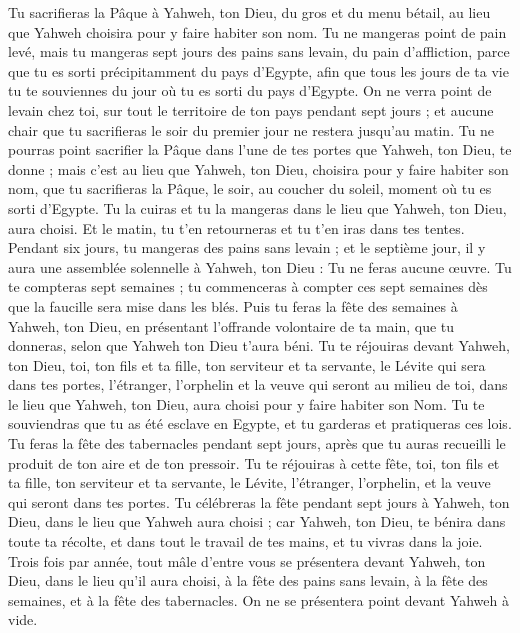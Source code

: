 \begin{multicols}{2}
Tu sacrifieras la Pâque à Yahweh, ton Dieu, du gros et du menu bétail, au lieu que Yahweh choisira pour y faire habiter son nom.
Tu ne mangeras point de pain levé, mais tu mangeras sept jours des pains sans levain, du pain d'affliction, parce que tu es sorti précipitamment du pays d'Egypte, afin que tous les jours de ta vie tu te souviennes du jour où tu es sorti du pays d'Egypte.
On ne verra point de levain chez toi, sur tout le territoire de ton pays pendant sept jours ; et aucune chair que tu sacrifieras le soir du premier jour ne restera jusqu'au matin.
Tu ne pourras point sacrifier la Pâque dans l’une de tes portes que Yahweh, ton Dieu, te donne ;
mais c’est au lieu que Yahweh, ton Dieu, choisira pour y faire habiter son nom, que tu sacrifieras la Pâque, le soir, au coucher du soleil, moment où tu es sorti d'Egypte.
Tu la cuiras et tu la mangeras dans le lieu que Yahweh, ton Dieu, aura choisi. Et le matin, tu t'en retourneras et tu t'en iras dans tes tentes.
Pendant six jours, tu mangeras des pains sans levain ; et le septième jour, il y aura une assemblée solennelle à Yahweh, ton Dieu : Tu ne feras aucune œuvre.
Tu te compteras sept semaines ; tu commenceras à compter ces sept semaines dès que la faucille sera mise dans les blés.
Puis tu feras la fête des semaines à Yahweh, ton Dieu, en présentant l'offrande volontaire de ta main, que tu donneras, selon que Yahweh ton Dieu t'aura béni.
Tu te réjouiras devant Yahweh, ton Dieu, toi, ton fils et ta fille, ton serviteur et ta servante, le Lévite qui sera dans tes portes, l'étranger, l'orphelin et la veuve qui seront au milieu de toi, dans le lieu que Yahweh, ton Dieu, aura choisi pour y faire habiter son Nom.
Tu te souviendras que tu as été esclave en Egypte, et tu garderas et pratiqueras ces lois.
Tu feras la fête des tabernacles pendant sept jours, après que tu auras recueilli le produit de ton aire et de ton pressoir.
Tu te réjouiras à cette fête, toi, ton fils et ta fille, ton serviteur et ta servante, le Lévite, l'étranger, l'orphelin, et la veuve qui seront dans tes portes.
Tu célébreras la fête pendant sept jours à Yahweh, ton Dieu, dans le lieu que Yahweh aura choisi ; car Yahweh, ton Dieu, te bénira dans toute ta récolte, et dans tout le travail de tes mains, et tu vivras dans la joie.
Trois fois par année, tout mâle d'entre vous se présentera devant Yahweh, ton Dieu, dans le lieu qu'il aura choisi, à la fête des pains sans levain, à la fête des semaines, et à la fête des tabernacles. On ne se présentera point devant Yahweh à vide.

\end{multicols}
